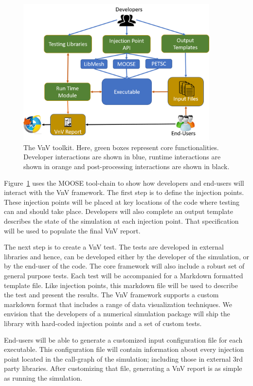 \begin{figure}
\centering
 \includegraphics[width=0.9\textwidth]{./narrative/figures/VnVOut.png}
 \caption{ The VnV toolkit. Here, green boxes represent core functionalities. Developer interactions are shown in blue, runtime interactions are shown in orange and post-processing interactions are shown in black. \label{fig:toolchain} } 
\end{figure}
 
Figure~\ref{fig:toolchain} uses the MOOSE tool-chain to show how developers and end-users will interact with the VnV framework. The first step is to define the injection points. These injection points will be placed at key locations of the code where testing can and should take place. Developers will also complete an output template describes the state of the simulation at each injection point. That specification will be used to populate the final VnV report. 

The next step is to create a VnV test. The tests are developed in external libraries and hence, can be developed either by the developer of the simulation, or by the end-user of the code. The core framework will also include a robust set of general purpose \VV tests. Each test will be accompanied for a Markdown formatted template file. Like injection points, this markdown file will be used to
describe the test and present the results. The VnV framework supports a custom markdown format that includes a range of data visualization techniques. We envision that the developers of a numerical simulation package will ship the library with hard-coded injection points and a set of custom \VV tests. 

End-users will be able to generate a customized input configuration file for each executable. This configuration file will contain information about every injection point located in the call-graph of the simulation; including those in external 3rd party libraries. After customizing that file, generating a VnV report is as simple as running the simulation.
 

